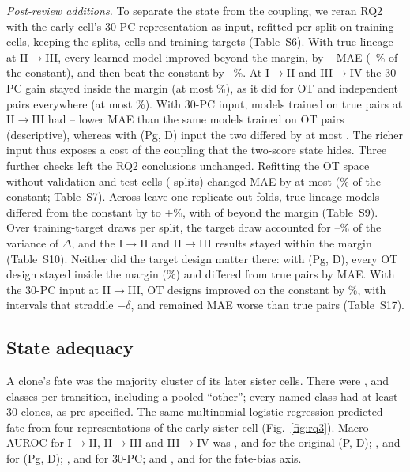 \documentclass[10pt,journal,compsoc]{IEEEtran}
\begin{document}
\emph{Post-review additions.} To separate the state from the coupling, we reran RQ2 with the
early cell's 30-PC representation as input, refitted per split on training cells, keeping
the splits, cells and training targets (Table~S6). With true lineage at II$\to$III, every
learned model improved beyond the margin, by \pcTrueTwoDeltaMin--\pcTrueTwoDeltaMax{} MAE
(\pcTrueTwoGainMinPct--\pcTrueTwoGainMaxPct\% of the constant), and then beat the constant
by \pcTrueTwoVsConstMinPct--\pcTrueTwoVsConstMaxPct\%. At I$\to$II and III$\to$IV the
30-PC gain stayed inside the margin (at most \pcTrueOtherMaxPct\%), as it did for OT and
independent pairs everywhere (at most \pcOIMaxGainPct\%). With 30-PC input, models trained
on true pairs at II$\to$III had \pcTrueMinusOTTwoMin--\pcTrueMinusOTTwoMax{} lower MAE than
the same models trained on OT pairs (descriptive), whereas with (Pg, D) input the two
differed by at most \pgTrueMinusOTTwoMaxAbs. The richer input thus exposes a cost of the
coupling that the two-score state hides. Three further checks left the RQ2 conclusions
unchanged. Refitting the OT space without validation and test cells (\indSeeds{} splits)
changed MAE by at most \indMaxAbsDelta{} (\indMaxAbsPct\% of the constant; Table~S7). Across
leave-one-replicate-out folds, true-lineage models differed from the constant by
\loroTrueMinPct{} to $+$\loroTrueMaxPct\%, with \loroTrueNBeyond{} of \loroTrueN{} beyond
the margin (Table~S9). Over \drawNDraws{} training-target draws per split, the target draw
accounted for \drawShareMinPct--\drawShareMaxPct\% of the variance of $\Delta$, and the
I$\to$II and II$\to$III results stayed within the margin (Table~S10). Neither did the target
design matter there: with (Pg, D), every OT design stayed inside the margin
(\tdEarlyOTPct\%) and differed from true pairs by \tdEarlyVsTrue{} MAE. With the 30-PC input at
II$\to$III, OT designs improved on the constant by \tdTwoPCOTPct\%, with intervals that
straddle $-\delta$, and remained \tdTwoPCOTVsTrue{} MAE worse than true pairs (Table~S17).




\subsection{State adequacy}\label{sec:rq3}
A clone's fate was the majority cluster of its later sister cells. There were
\rqThreeClassesOne, \rqThreeClassesTwo{} and \rqThreeClassesThree{} classes per transition,
including a pooled ``other''; every named class had at least 30 clones, as pre-specified.
The same multinomial logistic regression predicted fate from four representations of the
early sister cell (Fig.~\ref{fig:rq3}). Macro-AUROC for I$\to$II, II$\to$III and
III$\to$IV was \rqThreeAUCPDOne, \rqThreeAUCPDTwo{} and \rqThreeAUCPDThree{} for the
original (P, D); \rqThreeAUCPgDOne, \rqThreeAUCPgDTwo{} and \rqThreeAUCPgDThree{} for (Pg,
D); \rqThreeAUCPCOne, \rqThreeAUCPCTwo{} and \rqThreeAUCPCThree{} for 30-PC; and
\rqThreeAUCFateOne, \rqThreeAUCFateTwo{} and \rqThreeAUCFateThree{} for the fate-bias axis.
\end{document}
